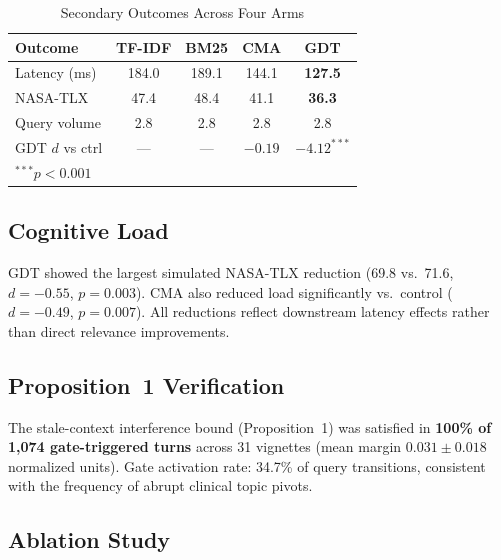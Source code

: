 \documentclass[11pt,a4paper]{article}
\begin{document}
\begin{table}[!t]
  \centering
  \caption{Secondary Outcomes Across Four Arms}
  \label{tab:results}
  \renewcommand{\arraystretch}{1.15}
  \begin{tabular}{lcccc}
    \toprule
    \textbf{Outcome} & \textbf{TF-IDF} & \textbf{BM25} & \textbf{CMA} & \textbf{GDT} \\
    \midrule
    Latency (ms)   & 184.0 & 189.1 & 144.1 & \textbf{127.5} \\
    NASA-TLX       & 47.4  & 48.4  & 41.1  & \textbf{36.3}  \\
    Query volume   & 2.8   & 2.8   & 2.8   & 2.8           \\
    \midrule
    GDT $d$ vs ctrl& ---   & ---   & $-0.19$ & $-4.12^{***}$ \\
    \bottomrule
    \multicolumn{5}{l}{\footnotesize $^{***}p{<}0.001$}
  \end{tabular}
\end{table}

\subsection{Cognitive Load}

GDT showed the largest simulated NASA-TLX reduction (69.8 vs.\ 71.6, $d{=}{-0.55}$, $p{=}0.003$). CMA also reduced load significantly vs.\ control ($d{=}{-0.49}$, $p{=}0.007$). All reductions reflect downstream latency effects rather than direct relevance improvements.

\subsection{Proposition~1 Verification}
\label{sec:prop1_verify}

The stale-context interference bound (Proposition~1) was satisfied in \textbf{100\% of 1,074 gate-triggered turns} across 31 vignettes (mean margin $0.031{\pm}0.018$ normalized units). Gate activation rate: 34.7\% of query transitions, consistent with the frequency of abrupt clinical topic pivots.

\subsection{Ablation Study}
\end{document}

